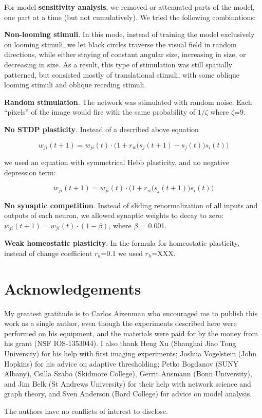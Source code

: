 \documentclass{article}
\begin{document}
For model \textbf{sensitivity analysis}, we removed or attenuated parts of the model, one part at a time (but not cumulatively). We tried the following combinations:

\textbf{Non-looming stimuli}. In this mode, instead of training the model exclusively on looming stimuli, we let black circles traverse the visual field in random directions, while either staying of constant angular size, increasing in size, or decreasing in size. As a result, this type of stimulation was still spatially patterned, but consisted mostly of translational stimuli, with some oblique looming stimuli and oblique receding stimuli.

\textbf{Random stimulation}. The network was stimulated with random noise. Each “pixels” of the image would fire with the same probability of $1/\zeta$ where $\zeta$=9.

\textbf{No STDP plasticity}. Instead of a described above equation 

$$w_{ji}(t+1) = w_{ji}(t)\cdot\Big(1+r_w\big(s_j(t+1)-s_j(t)\big)s_i(t)\Big)$$

we used an equation with symmetrical Hebb plasticity, and no negative depression term: 

$$w_{ji}(t+1) = w_{ji}(t)\cdot\Big(1+r_w\big(s_j(t+1)\big)s_i(t)\Big)$$

\textbf{No synaptic competition}. Instead of sliding renormalization of all inputs and outputs of each neuron, we allowed synaptic weights to decay to zero: $w_{ji}(t+1) = w_{ji}(t)\cdot (1-\beta)$, where $\beta$ = 0.001.

\textbf{Weak homeostatic plasticity}. In the formula for homeostatic plasticity, instead of change coefficient $r_h$=0.1 we used $r_h$=XXX.

\section*{Acknowledgements}

My greatest gratitude is to Carlos Aizenman who encouraged me to publish this work as a single author, even though the experiments described here were performed on his equipment, and the materials were paid for by the money from his grant (NSF IOS-1353044). I also thank Heng Xu (Shanghai Jiao Tong University) for his help with first imaging experiments; Joshua Vogelstein (John Hopkins) for his advice on adaptive thresholding; Petko Bogdanov (SUNY Albany), Csilla Szabo (Skidmore College), Gerrit Ansmann (Bonn University), and Jim Belk (St Andrews University) for their help with network science and graph theory, and Sven Anderson (Bard College) for advice on model analysis.


The authors have no conflicts of interest to disclose.

\nolinenumbers


\end{document}
